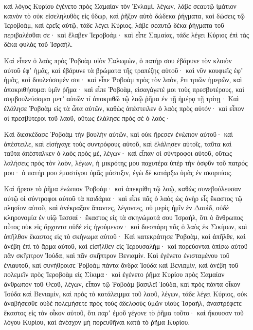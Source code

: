 {καὶ λόγος Κυρίου ἐγένετο πρὸς Σαμαίαν τὸν Ἐνλαμὶ, λέγων, λάβε σεαυτῷ ἱμάτιον καινὸν τὸ οὐκ εἰσεληλυθὸς εἰς ὕδωρ, καὶ ῥῆξον αὐτὸ δώδεκα ῥήγματα, καὶ δώσεις τῷ Ἱεροβοὰμ, καὶ ἐρεῖς αὐτῷ, τάδε λέγει Κύριος, λάβε σεαυτῷ δέκα ῥήγματα τοῦ περιβαλέσθαι σε· καὶ ἔλαβεν Ἱεροβοάμ· καὶ εἶπε Σαμαίας, τάδε λέγει Κύριος ἐπὶ τὰς δέκα φυλὰς τοῦ Ἰσραήλ.
\par }{\PP {}Καὶ εἶπεν ὁ λαὸς πρὸς Ῥοβοὰμ υἱὸν Σαλωμὼν, ὁ πατήρ σου ἐβάρυνε τὸν κλοιὸν αὐτοῦ ἐφʼ ἡμᾶς, καὶ ἐβάρυνε τὰ βρώματα τῆς τραπέζης αὐτοῦ· καὶ νῦν κουφιεῖς ἐφʼ ἡμᾶς, καὶ δουλεύσομέν σοι·
καὶ εἶπε Ῥοβοὰμ πρὸς τὸν λαὸν, ἔτι τριῶν ἡμερῶν, καὶ ἀποκριθήσομαι ὑμῖν ῥῆμα· καὶ εἶπε Ῥοβοὰμ, εἰσαγάγετέ μοι τοὺς πρεσβυτέρους, καὶ συμβουλεύσομαι μετʼ αὐτῶν τί ἀποκριθῶ τῷ λαῷ ῥῆμα ἐν τῇ ἡμέρᾳ τῇ τρίτῃ· Καὶ ἐλάλησε Ῥοβοὰμ εἰς τὰ ὦτα αὐτῶν, καθὼς ἀπέστειλεν ὁ λαὸς πρὸς αὐτόν· καὶ εἶπον οἱ πρεσβύτεροι τοῦ λαοῦ, οὕτως ἐλάλησε πρὸς σὲ ὁ λαός·
\par }{\PP {}Καὶ διεσκέδασε Ῥοβοὰμ τὴν βουλὴν αὐτῶν, καὶ οὐκ ἤρεσεν ἐνώπιον αὐτοῦ· καὶ ἀπέστειλε, καὶ εἰσήγαγε τοὺς συντρόφους αὐτοῦ, καὶ ἐλάλησεν αὐτοῖς, ταῦτα καὶ ταῦτα ἀπέσταλκεν ὁ λαὸς πρὸς μὲ, λέγων· καὶ εἶπαν οἱ σύντροφοι αὐτοῦ, οὕτως λαλήσεις πρὸς τὸν λαὸν, λέγων, ἡ μικρότης μου παχυτέρα ὑπὲρ τὴν ὀσφῦν τοῦ πατρός μου· ὁ πατήρ μου ἐμαστίγου ὑμᾶς μάστιξιν, ἐγὼ δὲ κατάρξω ὑμᾶς ἐν σκορπίοις.
\par }{\PP {}Καὶ ἤρεσε τὸ ῥῆμα ἐνώπιον Ῥοβοάμ· καὶ ἀπεκρίθη τῷ λαῷ, καθὼς συνεβούλευσαν αὐτῷ οἱ σύντροφοι αὐτοῦ τὰ παιδάρια·
καὶ εἶπε πᾶς ὁ λαὸς ὡς ἀνὴρ εἷς ἕκαστος τῷ πλησίον αὐτοῦ, καὶ ἀνέκραξαν ἅπαντες, λέγοντες, οὐ μερὶς ἡμῖν ἐν Δαυὶδ, οὐδὲ κληρονομία ἐν υἱῷ Ἰεσσαί· ἕκαστος εἰς τὰ σκηνώματά σου Ἰσραὴλ, ὅτι ὁ ἄνθρωπος οὗτος οὐκ εἰς ἄρχοντα οὐδὲ εἰς ἡγούμενον·
καὶ διεσπάρη πᾶς ὁ λαὸς ἐκ Σικίμων, καὶ ἀπῆλθον ἕκαστος εἰς τὸ σκήνωμα αὐτοῦ· Καὶ κατεκράτησε Ῥοβοὰμ, καὶ ἀπῆλθε, καὶ ἀνέβη ἐπὶ τὸ ἅρμα αὐτοῦ, καὶ εἰσῆλθεν εἰς Ἱερουσαλήμ· καὶ πορεύονται ὀπίσω αὐτοῦ πᾶν σκῆπτρον Ἰούδα, καὶ πᾶν σκῆπτρον Βενιαμίν.
Καὶ ἐγένετο ἐνισταμένου τοῦ ἐνιαυτοῦ, καὶ συνήθροισε Ῥοβοὰμ πάντα ἄνδρα Ἰούδα καὶ Βενιαμὶν, καὶ ἀνέβη τοῦ πολεμεῖν πρὸς Ἱεροβοὰμ εἰς Σίκιμα·
καὶ ἐγένετο ῥῆμα Κυρίου πρὸς Σαμαίαν ἄνθρωπον τοῦ Θεοῦ, λέγων, εἶπον τῷ Ῥοβοὰμ βασιλεῖ Ἰούδα, καὶ πρὸς πάντα οἶκον Ἰούδα καὶ Βενιαμὶν, καὶ πρὸς τὸ κατάλειμμα τοῦ λαοῦ, λέγων, τάδε λέγει Κύριος, οὐκ ἀναβήσεσθε οὐδὲ πολεμήσετε πρὸς τοὺς ἀδελφοὺς ὑμῶν υἱοὺς Ἰσραὴλ, ἀναστρέφετε ἕκαστος εἰς τὸν οἶκον αὐτοῦ, ὅτι παρʼ ἐμοῦ γέγονε τὸ ῥῆμα τοῦτο·
καὶ ἤκουσαν τοῦ λόγου Κυρίου, καὶ ἀνέσχον μὴ πορευθῆναι κατὰ τὸ ῥῆμα Κυρίου.
}
